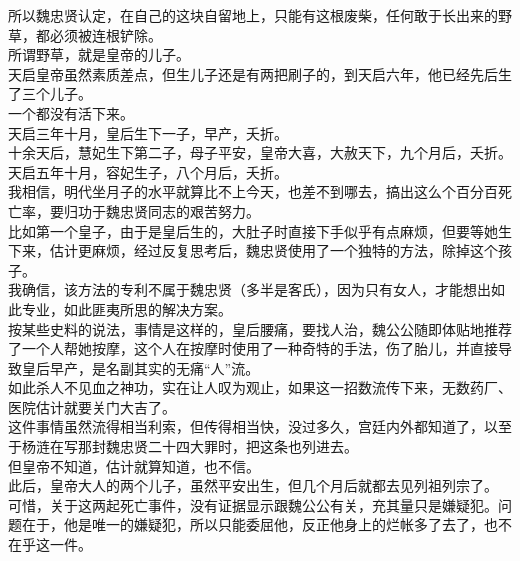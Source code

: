 \begin{multicols}{\theparacolNo}
所以魏忠贤认定，在自己的这块自留地上，只能有这根废柴，任何敢于长出来的野草，都必须被连根铲除。\\

所谓野草，就是皇帝的儿子。\\

天启皇帝虽然素质差点，但生儿子还是有两把刷子的，到天启六年，他已经先后生了三个儿子。\\

一个都没有活下来。\\

天启三年十月，皇后生下一子，早产，夭折。\\

十余天后，慧妃生下第二子，母子平安，皇帝大喜，大赦天下，九个月后，夭折。\\

天启五年十月，容妃生子，八个月后，夭折。\\

我相信，明代坐月子的水平就算比不上今天，也差不到哪去，搞出这么个百分百死亡率，要归功于魏忠贤同志的艰苦努力。\\

比如第一个皇子，由于是皇后生的，大肚子时直接下手似乎有点麻烦，但要等她生下来，估计更麻烦，经过反复思考后，魏忠贤使用了一个独特的方法，除掉这个孩子。\\

我确信，该方法的专利不属于魏忠贤（多半是客氏），因为只有女人，才能想出如此专业，如此匪夷所思的解决方案。\\

按某些史料的说法，事情是这样的，皇后腰痛，要找人治，魏公公随即体贴地推荐了一个人帮她按摩，这个人在按摩时使用了一种奇特的手法，伤了胎儿，并直接导致皇后早产，是名副其实的无痛“人”流。\\

如此杀人不见血之神功，实在让人叹为观止，如果这一招数流传下来，无数药厂、医院估计就要关门大吉了。\\

这件事情虽然流得相当利索，但传得相当快，没过多久，宫廷内外都知道了，以至于杨涟在写那封魏忠贤二十四大罪时，把这条也列进去。\\

但皇帝不知道，估计就算知道，也不信。\\

此后，皇帝大人的两个儿子，虽然平安出生，但几个月后就都去见列祖列宗了。\\

可惜，关于这两起死亡事件，没有证据显示跟魏公公有关，充其量只是嫌疑犯。问题在于，他是唯一的嫌疑犯，所以只能委屈他，反正他身上的烂帐多了去了，也不在乎这一件。\\


\end{multicols}
